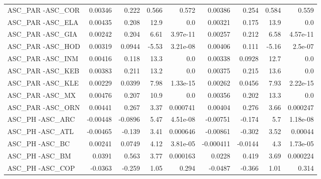 \begin{tabular}{lrrrrrrrr}
ASC\_PAR -ASC\_COR                        &     0.00346 &        0.222 &   0.566 &    0.572 &    0.00386 &       0.254 &        0.584 &         0.559 \\
ASC\_PAR -ASC\_ELA                        &     0.00435 &        0.208 &    12.9 &      0.0 &    0.00321 &       0.175 &         13.9 &           0.0 \\
ASC\_PAR -ASC\_GIA                        &     0.00242 &        0.204 &    6.61 & 3.97e-11 &    0.00257 &       0.212 &         6.58 &      4.57e-11 \\
ASC\_PAR -ASC\_HOD                        &     0.00319 &       0.0944 &   -5.53 & 3.21e-08 &    0.00406 &       0.111 &        -5.16 &       2.5e-07 \\
ASC\_PAR -ASC\_INM                        &     0.00416 &        0.118 &    13.3 &      0.0 &    0.00338 &      0.0928 &         12.7 &           0.0 \\
ASC\_PAR -ASC\_KEB                        &     0.00383 &        0.211 &    13.2 &      0.0 &    0.00375 &       0.215 &         13.6 &           0.0 \\
ASC\_PAR -ASC\_KLE                        &     0.00229 &       0.0399 &    7.98 & 1.33e-15 &    0.00262 &      0.0456 &         7.93 &      2.22e-15 \\
ASC\_PAR -ASC\_MX                         &     0.00476 &        0.207 &    10.9 &      0.0 &    0.00356 &       0.202 &         13.3 &           0.0 \\
ASC\_PAR -ASC\_ORN                        &     0.00441 &        0.267 &    3.37 & 0.000741 &    0.00404 &       0.276 &         3.66 &      0.000247 \\
ASC\_PH -ASC\_ARC                         &    -0.00448 &      -0.0896 &    5.47 & 4.51e-08 &   -0.00751 &      -0.174 &          5.7 &      1.18e-08 \\
ASC\_PH -ASC\_ATL                         &    -0.00465 &       -0.139 &    3.41 & 0.000646 &   -0.00861 &      -0.302 &         3.52 &       0.00044 \\
ASC\_PH -ASC\_BC                          &     0.00241 &       0.0749 &    4.12 & 3.81e-05 &  -0.000411 &     -0.0144 &          4.3 &      1.73e-05 \\
ASC\_PH -ASC\_BM                          &      0.0391 &        0.563 &    3.77 & 0.000163 &     0.0228 &       0.419 &         3.69 &      0.000224 \\
ASC\_PH -ASC\_COP                         &     -0.0363 &       -0.259 &    1.05 &    0.294 &    -0.0487 &      -0.366 &         1.01 &         0.314 \\

\end{tabular}
